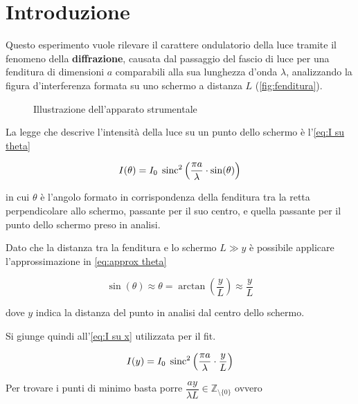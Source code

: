 \documentclass[../main.tex]{subfiles}
\begin{document}
\section{Introduzione}

Questo esperimento vuole rilevare il carattere ondulatorio della luce tramite il fenomeno della \textbf{diffrazione}, causata dal passaggio del fascio di luce per una fenditura di dimensioni $a$ comparabili alla sua lunghezza d'onda $\lambda$, analizzando la figura d'interferenza formata su uno schermo a distanza $L$ (\autoref{fig:fenditura}).

\begin{figure}[ht!]
    \centering
    \caption{Illustrazione dell'apparato strumentale}
    \label{fig:fenditura}
\end{figure}

La legge che descrive l'intensità della luce su un punto dello schermo è l'\autoref{eq:I su theta}

\begin{equation} \label{eq:I su theta}
    I(\theta) = I_{0} \; \operatorname{sinc}^{2} \left( \frac{\pi a}{\lambda} \cdot \sin(\theta)  \right)
\end{equation}

in cui $\theta$ è l'angolo formato in corrispondenza della fenditura tra la retta perpendicolare allo schermo, passante per il suo centro, e quella passante per il punto dello schermo preso in analisi.

Dato che la distanza tra la fenditura e lo schermo $L \gg y$ è possibile applicare l'approssimazione in \autoref{eq:approx theta}

\begin{equation} \label{eq:approx theta}
    \sin(\theta) \approx \theta = \arctan\left( \frac{y}{L} \right) \approx \frac{y}{L} 
\end{equation}

dove $y$ indica la distanza del punto in analisi dal centro dello schermo.

Si giunge quindi all'\autoref{eq:I su x} utilizzata per il fit.

\begin{equation} \label{eq:I su x}
    I(y) = I_{0} \; \operatorname{sinc}^{2} \left( \frac{\pi a}{\lambda} \cdot \frac{y}{L}  \right)
\end{equation}

Per trovare i punti di minimo basta porre $\dfrac{a y}{\lambda L} \in \mathbb{Z}_{\setminus \{0\}}$ ovvero
\end{document}
